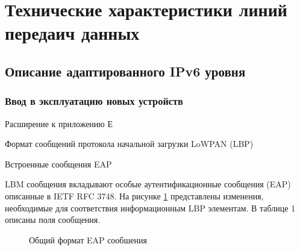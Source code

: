 \section{Технические характеристики линий передаич данных} %

\subsection{Описание адаптированного IPv6 уровня} %
 
\subsubsection{Ввод в эксплуатацию новых устройств} %

Расширение к приложению Е %

Формат сообщений протокола начальной загрузки LoWPAN (LBP) %

Встроенные сообщения EAP %

LBM сообщения вкладывают особые аутентификационные сообщения (EAP) описанные в IETF RFC 3748. На рисунке \ref{img:9-23} представлены изменения, необходимые для соответствия информационным LBP элементам. В таблице 1 описаны поля сообщения.  %

\begin{figure}[h]
 \label{img:9-23}
 \caption{Общий формат EAP сообшения}
\end{figure}

